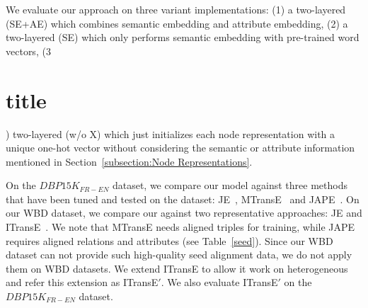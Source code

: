 
    	We evaluate our approach on three variant implementations: (1) a two-layered \HRGCN (SE+AE) which combines semantic embedding and
attribute embedding, (2) a two-layered \HRGCN (SE) which only performs semantic embedding with pre-trained word vectors, (3\part{title}) two-layered
\HRGCN (w/o X) which just initializes each node representation with a unique one-hot vector without considering the semantic or attribute information mentioned
in Section~\ref{subsection:Node Representations}.

    On the $DBP15K_{FR-EN}$ dataset, we compare our \HRGCN model against three methods that have been tuned and tested on the dataset:
    JE~\cite{hao2016joint}, MTransE~\cite{chen2016multilingual} and JAPE~\cite{sun2017cross}. On our WBD dataset, we compare our \HRGCN
    against two representative approaches: JE and ITransE~\cite{zhu2017iterative}. We note that MTransE needs aligned triples for training, while JAPE requires aligned relations and attributes (see Table~\ref{seed}). Since our WBD dataset can not provide such high-quality seed alignment data, we do not apply them on WBD datasets. We extend ITransE to allow it work on heterogeneous
    \KGs and refer this extension as ITransE$'$. We also evaluate ITransE$'$ on the $DBP15K_{FR-EN}$ dataset.
%


	
%	



